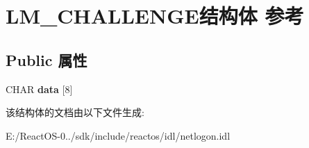 \hypertarget{struct_l_m___c_h_a_l_l_e_n_g_e}{}\section{L\+M\+\_\+\+C\+H\+A\+L\+L\+E\+N\+G\+E结构体 参考}
\label{struct_l_m___c_h_a_l_l_e_n_g_e}
\subsection*{Public 属性}
\begin{DoxyCompactItemize}
\item 
\mbox{\label{struct_l_m___c_h_a_l_l_e_n_g_e_af203aa2e6c79ed4b7243c5f60ef610ff}} 
C\+H\+AR {\bfseries data} \mbox{[}8\mbox{]}
\end{DoxyCompactItemize}


该结构体的文档由以下文件生成\+:\begin{DoxyCompactItemize}
\item 
E\+:/\+React\+O\+S-\/0../sdk/include/reactos/idl/netlogon.\+idl\end{DoxyCompactItemize}
